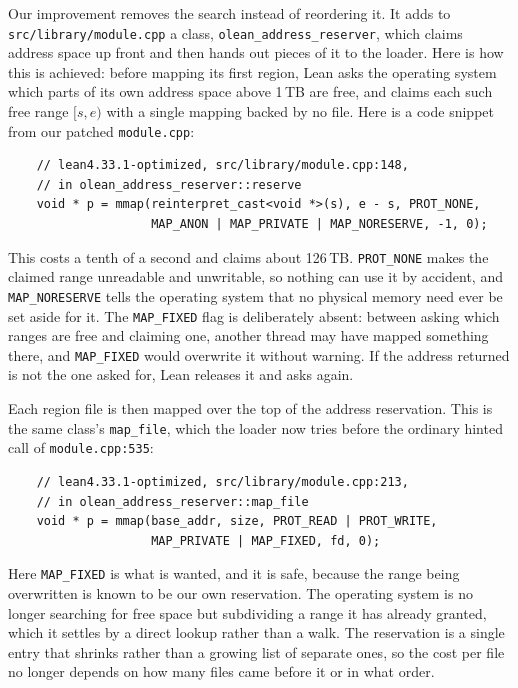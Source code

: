 \documentclass{article}
\newcommand{\Lean}{Lean\xspace}      %
\begin{document}
Our improvement removes the search instead of reordering it. It adds to \texttt{src/library/module.cpp} a class, \texttt{olean\_address\_reserver}, which claims address space up front and then hands out pieces of it to the loader. Here is how this is achieved:
before mapping its first region, \Lean asks the operating system which parts of its own address space above 1\,TB are free, and claims each such free range $[s, e)$ with a single mapping backed by no file. Here is a code snippet from our patched \texttt{module.cpp}:

\begin{small}
\begin{verbatim}
    // lean4.33.1-optimized, src/library/module.cpp:148,
    // in olean_address_reserver::reserve
    void * p = mmap(reinterpret_cast<void *>(s), e - s, PROT_NONE,
                    MAP_ANON | MAP_PRIVATE | MAP_NORESERVE, -1, 0);
\end{verbatim}
\end{small}

\noindent This costs a tenth of a second and claims about 126\,TB. \texttt{PROT\_NONE} makes the claimed range unreadable and unwritable, so nothing can use it by accident, and \texttt{MAP\_NORESERVE} tells the operating system that no physical memory need ever be set aside for it. The \texttt{MAP\_FIXED} flag is deliberately absent: between asking which ranges are free and claiming one, another thread may have mapped something there, and \texttt{MAP\_FIXED} would overwrite it without warning. If the address returned is not the one asked for, \Lean releases it and asks again.

Each region file is then mapped over the top of the address reservation. This is the same class's \texttt{map\_file}, which the loader now tries before the ordinary hinted call of \texttt{module.cpp:535}:

\begin{small}
\begin{verbatim}
    // lean4.33.1-optimized, src/library/module.cpp:213,
    // in olean_address_reserver::map_file
    void * p = mmap(base_addr, size, PROT_READ | PROT_WRITE,
                    MAP_PRIVATE | MAP_FIXED, fd, 0);
\end{verbatim}
\end{small}

\noindent Here \texttt{MAP\_FIXED} is what is wanted, and it is safe, because the range being overwritten is known to be our own reservation. The operating system is no longer searching for free space but subdividing a range it has already granted, which it settles by a direct lookup rather than a walk. The reservation is a single entry that shrinks rather than a growing list of separate ones, so the cost per file no longer depends on how many files came before it or in what order.
\end{document}
